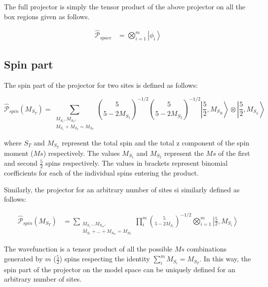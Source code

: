 \documentclass[12pt,twoside]{report}
\begin{document}
	The full projector is simply the tensor product of the above projector
	on all the box regions given as follows.

	\begin{equation}
		\begin{split}
			\hat{\mathcal{P}}_{space} & = \bigotimes_{i = 1}^{m}\left|\phi_i\right\rangle
		\end{split}
		\label{eq:demodel}
	\end{equation}

	\subsection{Spin part}

	The spin part of the projector for two sites is defined as follows:


	\begin{equation}
			\hat{\mathcal{P}}_{spin}(M_{S_T})  = \sum_{\substack{M_{S_1},M_{S_2}, \\ M_{S_1}+M_{S_2}=M_{S_T}}}
			\binom{5}{5 - 2 M_{S_1}}^{-1/2}\binom{5}{5 - 2 M_{S_2}}^{-1/2}
			\left |\frac{5}{2},M_{S_R}\right\rangle\otimes\left|\frac{5}{2},M_{S_L}\right\rangle
		\label{eq:demodel}
	\end{equation}

	where $S_T$ and $M_{S_T}$ represent the total spin and the total z component
	of the spin moment ($Ms$) respectively. The values $M_{S_1}$ and $M_{S_2}$
	represent the $Ms$ of the first and second $\frac{5}{2}$ spins respectively.
	The values in brackets represent binomial coefficients for each of the
	individual spins entering the product.

	Similarly, the projector for an arbitrary number of sites si similarly defined
	as follows:

	\begin{equation}
		\begin{split}
			\hat{\mathcal{P}}_{spin}(M_{S_T}) & = \sum_{\substack{M_{S_1}\dots M_{S_m},\\ M_{S_1} + \dots + M_{S_m} = M_{S_T}}} \prod_{i}^{m}
			\binom{5}{5 - 2 M_{S_i}}^{-1/2}
			\bigotimes_{i = 1}^{m}\left|\frac{5}{2},M_{S_i}\right\rangle
		\end{split}
		\label{eq:demodel}
	\end{equation}

    The wavefunction is a tensor product of all the possible $Ms$ combinations
	generated by $m$ ($\frac{5}{2}$) spins respecting the identity
	$\sum_i^m M_{S_i} = M_{S_T}$.  In this way, the spin part of the projector on the
	model space can be uniquely defined for an arbitrary number of sites.
\end{document}
